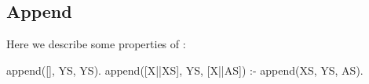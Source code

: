 





\subsection{Append}
Here we describe some properties of  :
%
\begin{yapcode}
 append([], YS, YS).
 append([X||XS], YS, [X||AS]) :- append(XS, YS, AS).
\end{yapcode}


